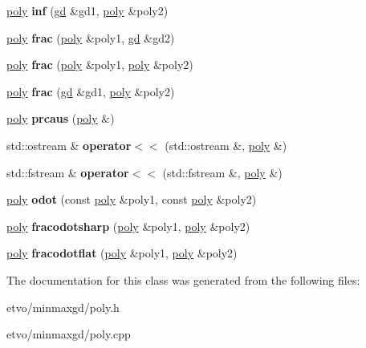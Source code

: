 \begin{DoxyCompactItemize}
\mbox{\hyperlink{classmmgd_1_1poly}{poly}} {\bfseries inf} (\mbox{\hyperlink{classmmgd_1_1gd}{gd}} \&gd1, \mbox{\hyperlink{classmmgd_1_1poly}{poly}} \&poly2)
\item 
\mbox{\label{classmmgd_1_1poly_a1ca2365b15ec5d9647e2ee8cc82bc0c3}} 
\mbox{\hyperlink{classmmgd_1_1poly}{poly}} {\bfseries frac} (\mbox{\hyperlink{classmmgd_1_1poly}{poly}} \&poly1, \mbox{\hyperlink{classmmgd_1_1gd}{gd}} \&gd2)
\item 
\mbox{\label{classmmgd_1_1poly_a2bb496ce83846bee4b6273821e059827}} 
\mbox{\hyperlink{classmmgd_1_1poly}{poly}} {\bfseries frac} (\mbox{\hyperlink{classmmgd_1_1poly}{poly}} \&poly1, \mbox{\hyperlink{classmmgd_1_1poly}{poly}} \&poly2)
\item 
\mbox{\label{classmmgd_1_1poly_af8dd7f52f6fa54f4f40d657652b14a54}} 
\mbox{\hyperlink{classmmgd_1_1poly}{poly}} {\bfseries frac} (\mbox{\hyperlink{classmmgd_1_1gd}{gd}} \&gd1, \mbox{\hyperlink{classmmgd_1_1poly}{poly}} \&poly2)
\item 
\mbox{\label{classmmgd_1_1poly_ad9580516418e4c9c5ee22b7f67cfb6ee}} 
\mbox{\hyperlink{classmmgd_1_1poly}{poly}} {\bfseries prcaus} (\mbox{\hyperlink{classmmgd_1_1poly}{poly}} \&)
\item 
\mbox{\label{classmmgd_1_1poly_a0361c355a8ea5d7e13ec20144390082f}} 
std\+::ostream \& {\bfseries operator$<$$<$} (std\+::ostream \&, \mbox{\hyperlink{classmmgd_1_1poly}{poly}} \&)
\item 
\mbox{\label{classmmgd_1_1poly_af0ab9a74b034ed507c6070d9a47951b8}} 
std\+::fstream \& {\bfseries operator$<$$<$} (std\+::fstream \&, \mbox{\hyperlink{classmmgd_1_1poly}{poly}} \&)
\item 
\mbox{\label{classmmgd_1_1poly_a9cecbf55fe370b38e24b8b639fd1ee03}} 
\mbox{\hyperlink{classmmgd_1_1poly}{poly}} {\bfseries odot} (const \mbox{\hyperlink{classmmgd_1_1poly}{poly}} \&poly1, const \mbox{\hyperlink{classmmgd_1_1poly}{poly}} \&poly2)
\item 
\mbox{\label{classmmgd_1_1poly_aff323f3e36b51b89ff4b52ffdf7464dd}} 
\mbox{\hyperlink{classmmgd_1_1poly}{poly}} {\bfseries fracodotsharp} (\mbox{\hyperlink{classmmgd_1_1poly}{poly}} \&poly1, \mbox{\hyperlink{classmmgd_1_1poly}{poly}} \&poly2)
\item 
\mbox{\label{classmmgd_1_1poly_ad284d1dbb550ed9c6a6ad3f9f3e2e3cc}} 
\mbox{\hyperlink{classmmgd_1_1poly}{poly}} {\bfseries fracodotflat} (\mbox{\hyperlink{classmmgd_1_1poly}{poly}} \&poly1, \mbox{\hyperlink{classmmgd_1_1poly}{poly}} \&poly2)
\end{DoxyCompactItemize}


The documentation for this class was generated from the following files\+:\begin{DoxyCompactItemize}
\item 
etvo/minmaxgd/poly.\+h\item 
etvo/minmaxgd/poly.\+cpp\end{DoxyCompactItemize}

